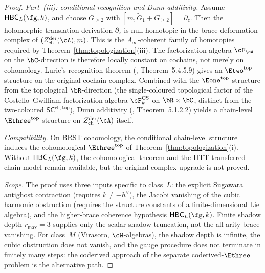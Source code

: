 \begin{proof}
\emph{Part~\textup{(iii)}: conditional recognition and Dunn
additivity.}
Assume $\mathsf{HBC}_L(\fg,k)$, and choose
$G_{\geq2}$ with
$[m,\widetilde G_1+G_{\geq2}]=\partial_z$. Then the
holomorphic translation derivation $\partial_z$ is
null-homotopic in the brace deformation complex of
$(Z^{\mathrm{der}}_{\mathrm{ch}}(\cA), m)$. This is the
$A_\infty$-coherent family of homotopies required by
Theorem~\ref{thm:topologization}(iii).
The factorization algebra $\cF_\cA$ on the $\bC$-direction
is therefore locally constant on cochains, not merely on
cohomology. Lurie's recognition theorem
(\cite{HA}, Theorem~5.4.5.9) gives an
$\Etwo^{\mathrm{top}}$-structure on the original cochain
complex. Combined with the $\Eone^{\mathrm{top}}$-structure
from the topological $\bR$-direction
(the single-coloured topological factor of the
Costello--Gwilliam factorization algebra $\cF^{\mathrm{CS}}_k$
on $\bR \times \bC$, distinct from the two-coloured
$\mathsf{SC}^{\mathrm{ch,top}}$), Dunn additivity
(\cite{HA}, Theorem~5.1.2.2) yields a chain-level
$\Ethree^{\mathrm{top}}$-structure on
$Z^{\mathrm{der}}_{\mathrm{ch}}(\cA)$ itself.

\emph{Compatibility.}
On BRST cohomology, the conditional chain-level structure
induces the cohomological $\Ethree^{\mathrm{top}}$ of
Theorem~\ref{thm:topologization}(i). Without
$\mathsf{HBC}_L(\fg,k)$, the cohomological theorem and the
HTT-transferred chain model remain available, but the
original-complex upgrade is not proved.

\emph{Scope.}
The proof uses three inputs specific to
class~$L$: the explicit Sugawara antighost contraction
(requires $k \neq -h^\vee$), the Jacobi vanishing of
the cubic harmonic obstruction (requires the structure
constants of a finite-dimensional Lie algebra), and the
higher-brace coherence hypothesis
$\mathsf{HBC}_L(\fg,k)$. Finite shadow depth
$r_{\max}=3$ supplies only the scalar shadow truncation,
not the all-arity brace vanishing. For class~$M$
(Virasoro, $\cW$-algebras), the shadow depth is
infinite, the cubic obstruction does not vanish, and
the gauge procedure does not terminate in finitely
many steps: the coderived approach of
the separate coderived-$\Ethree$ problem is the alternative path.
\end{proof}

